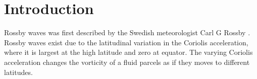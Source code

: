\section{Introduction}
Rossby waves was first described by the Swedish meteorologist Carl G Rossby
\parencite{Rossby1939}. Rossby waves exist due to the latitudinal variation in
the Coriolis acceleration, where it is largest at the high latitude and zero at
equator. The varying Coriolis acceleration changes the vorticity of a fluid
parcels as if they moves to different latitudes. 
